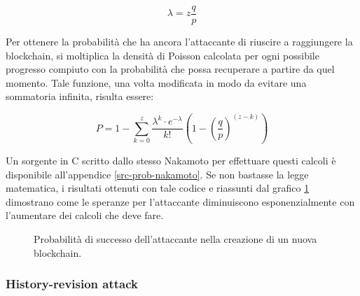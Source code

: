 \[
\lambda = z \frac{q}{p}
\]

Per ottenere la probabilità che ha ancora l'attaccante di riuscire a raggiungere la blockchain, si moltiplica la densità di Poisson calcolata per ogni possibile progresso compiuto con la probabilità che possa recuperare a partire da quel momento. Tale funzione, una volta modificata in modo da evitare una sommatoria infinita, risulta essere:

\[
P = 1 - \sum^z_{k=0} \frac{\lambda^k \cdot e^{-\lambda}}{k!} \left( 1 - \left( \frac{q}{p} \right)^{\left( z - k \right)} \right)
\]

Un sorgente in C scritto dallo stesso Nakamoto per effettuare questi calcoli è disponibile all'appendice \ref{src-prob-nakamoto}.
Se non bastasse la legge matematica, i risultati ottenuti con tale codice e riassunti dal grafico \ref{grafico-risultati-codice-nakamoto} dimostrano come le speranze per l'attaccante diminuiscono esponenzialmente con l'aumentare dei calcoli che deve fare.

\begin{figure}
  \caption{Probabilità di successo dell'attaccante nella creazione di un nuova blockchain.\label{grafico-risultati-codice-nakamoto}}
\end{figure}

\subsubsection{History-revision attack}\label{history-revision}

